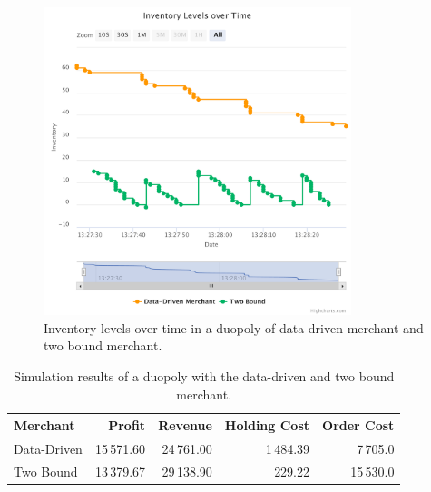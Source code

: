 \begin{figure}[t]
	\centering
	\includegraphics[width=0.8\textwidth]{figures/duopoly_bound_inventory}
	\caption[Inventory levels: data-driven merchant versus two bound merchant]{Inventory levels over time in a duopoly of data-driven merchant and two bound merchant.}
	\label{fig:duopoly_bound_inventory}
\end{figure}

\begin{table}[t]
	\centering
	\begin{tabular}{lrrrr}
		\toprule
		\textbf{Merchant} & \textbf{Profit} & \textbf{Revenue} & \textbf{Holding Cost} & \textbf{Order Cost} \\
		\midrule
		Data-Driven & 15\,571.60 & 24\,761.00 & 1\,484.39 & 7\,705.0 \\
		Two Bound & 13\,379.67 & 29\,138.90 & 229.22 & 15\,530.0 \\
		\bottomrule
	\end{tabular}
	\caption{Simulation results of a duopoly with the data-driven and two bound merchant.}
	\label{tab:duopoly_bound}
\end{table}


